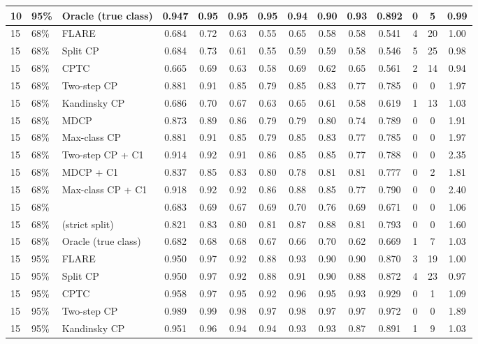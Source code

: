 \begin{longtable}{lllccccccccccc}
10 & 95\% & Oracle (true class) & 0.947 & 0.95 & 0.95 & 0.95 & 0.94 & 0.90 & 0.93 & 0.892 & 0 & 5 & 0.99 \\
\midrule
15 & 68\% & FLARE & 0.684 & 0.72 & 0.63 & 0.55 & 0.65 & 0.58 & 0.58 & 0.541 & 4 & 20 & 1.00 \\
15 & 68\% & Split CP & 0.684 & 0.73 & 0.61 & 0.55 & 0.59 & 0.59 & 0.58 & 0.546 & 5 & 25 & 0.98 \\
15 & 68\% & CPTC & 0.665 & 0.69 & 0.63 & 0.58 & 0.69 & 0.62 & 0.65 & 0.561 & 2 & 14 & 0.94 \\
15 & 68\% & Two-step CP & 0.881 & 0.91 & 0.85 & 0.79 & 0.85 & 0.83 & 0.77 & 0.785 & 0 & 0 & 1.97 \\
15 & 68\% & Kandinsky CP & 0.686 & 0.70 & 0.67 & 0.63 & 0.65 & 0.61 & 0.58 & 0.619 & 1 & 13 & 1.03 \\
15 & 68\% & MDCP & 0.873 & 0.89 & 0.86 & 0.79 & 0.79 & 0.80 & 0.74 & 0.789 & 0 & 0 & 1.91 \\
15 & 68\% & Max-class CP & 0.881 & 0.91 & 0.85 & 0.79 & 0.85 & 0.83 & 0.77 & 0.785 & 0 & 0 & 1.97 \\
15 & 68\% & Two-step CP + C1 & 0.914 & 0.92 & 0.91 & 0.86 & 0.85 & 0.85 & 0.77 & 0.788 & 0 & 0 & 2.35 \\
15 & 68\% & MDCP + C1 & 0.837 & 0.85 & 0.83 & 0.80 & 0.78 & 0.81 & 0.81 & 0.777 & 0 & 2 & 1.81 \\
15 & 68\% & Max-class CP + C1 & 0.918 & 0.92 & 0.92 & 0.86 & 0.88 & 0.85 & 0.77 & 0.790 & 0 & 0 & 2.40 \\
15 & 68\% & \gamut{} & 0.683 & 0.69 & 0.67 & 0.69 & 0.70 & 0.76 & 0.69 & 0.671 & 0 & 0 & 1.06 \\
15 & 68\% & \gamut{} (strict split) & 0.821 & 0.83 & 0.80 & 0.81 & 0.87 & 0.88 & 0.81 & 0.793 & 0 & 0 & 1.60 \\
15 & 68\% & Oracle (true class) & 0.682 & 0.68 & 0.68 & 0.67 & 0.66 & 0.70 & 0.62 & 0.669 & 1 & 7 & 1.03 \\
\midrule
15 & 95\% & FLARE & 0.950 & 0.97 & 0.92 & 0.88 & 0.93 & 0.90 & 0.90 & 0.870 & 3 & 19 & 1.00 \\
15 & 95\% & Split CP & 0.950 & 0.97 & 0.92 & 0.88 & 0.91 & 0.90 & 0.88 & 0.872 & 4 & 23 & 0.97 \\
15 & 95\% & CPTC & 0.958 & 0.97 & 0.95 & 0.92 & 0.96 & 0.95 & 0.93 & 0.929 & 0 & 1 & 1.09 \\
15 & 95\% & Two-step CP & 0.989 & 0.99 & 0.98 & 0.97 & 0.98 & 0.97 & 0.97 & 0.972 & 0 & 0 & 1.89 \\
15 & 95\% & Kandinsky CP & 0.951 & 0.96 & 0.94 & 0.94 & 0.93 & 0.93 & 0.87 & 0.891 & 1 & 9 & 1.03 \\

\end{longtable}
